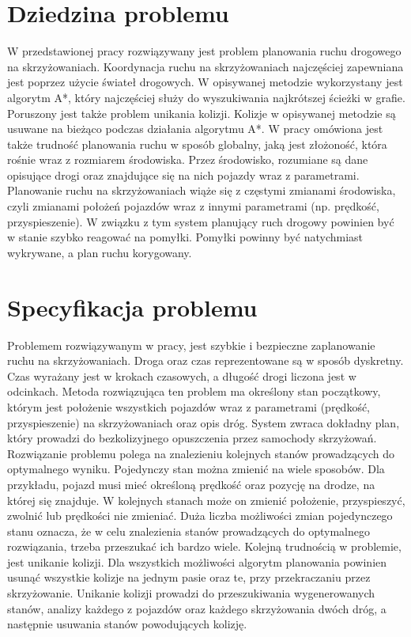 
\section{Dziedzina problemu}

W przedstawionej pracy rozwiązywany jest problem planowania ruchu drogowego na skrzyżowaniach. Koordynacja ruchu na skrzyżowaniach najczęściej zapewniana jest poprzez użycie świateł drogowych. W opisywanej metodzie wykorzystany jest algorytm A*, który najczęściej służy do wyszukiwania najkrótszej ścieżki w grafie. Poruszony jest także problem unikania kolizji. Kolizje w opisywanej metodzie są usuwane na bieżąco podczas działania algorytmu A*.
\newline
\indent
W pracy omówiona jest także trudność planowania ruchu w sposób globalny, jaką jest złożoność, która rośnie wraz z rozmiarem środowiska. Przez środowisko, rozumiane są dane opisujące drogi oraz znajdujące się na nich pojazdy wraz z parametrami. Planowanie ruchu na skrzyżowaniach wiąże się z częstymi zmianami środowiska, czyli zmianami położeń pojazdów wraz z innymi parametrami (np. prędkość, przyspieszenie). W związku z tym system planujący ruch drogowy powinien być w stanie szybko reagować na pomyłki. Pomyłki powinny być natychmiast wykrywane, a plan ruchu korygowany.

\section{Specyfikacja problemu}

Problemem rozwiązywanym w pracy, jest szybkie i bezpieczne zaplanowanie ruchu na skrzyżowaniach. Droga oraz czas reprezentowane są w sposób dyskretny. Czas wyrażany jest w krokach czasowych, a długość drogi liczona jest w odcinkach. Metoda rozwiązująca ten problem ma określony stan początkowy, którym jest położenie wszystkich pojazdów wraz z parametrami (prędkość, przyspieszenie) na skrzyżowaniach oraz opis dróg. System zwraca dokładny plan, który prowadzi do bezkolizyjnego opuszczenia przez samochody skrzyżowań. Rozwiązanie problemu polega na znalezieniu kolejnych stanów prowadzących do optymalnego wyniku. Pojedynczy stan można zmienić na wiele sposobów. Dla przykładu, pojazd musi mieć określoną prędkość oraz pozycję na drodze, na której się znajduje. W kolejnych stanach może on zmienić położenie, przyspieszyć, zwolnić lub prędkości nie zmieniać. Duża liczba możliwości zmian pojedynczego stanu oznacza, że w celu znalezienia stanów prowadzących do optymalnego rozwiązania, trzeba przeszukać ich bardzo wiele.
\newline
\indent
Kolejną trudnością w problemie, jest unikanie kolizji. Dla wszystkich możliwości algorytm planowania powinien usunąć wszystkie kolizje na jednym pasie oraz te, przy przekraczaniu przez skrzyżowanie. Unikanie kolizji prowadzi do przeszukiwania wygenerowanych stanów, analizy każdego z pojazdów oraz każdego skrzyżowania dwóch dróg, a następnie usuwania stanów powodujących kolizję.

